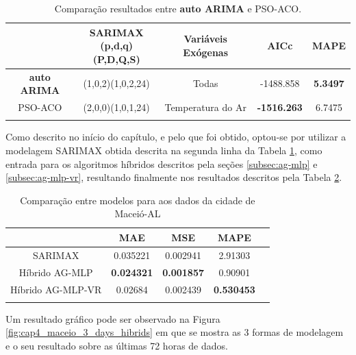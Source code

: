 \begin{table}[htbp]
\caption{Comparação resultados entre \textbf{auto ARIMA} e PSO-ACO.}
\begin{center}
\begin{tabular}{ccccc}
                    & \Longstack{SARIMAX \\ (p,d,q)(P,D,Q,S)} & Variáveis Exógenas & AICc & MAPE  \\\hline
\textbf{auto ARIMA} & (1,0,2)(1,0,2,24) & Todas & -1488.858 & \textbf{5.3497} \\\hline
PSO-ACO             & (2,0,0)(1,0,1,24) & Temperatura do Ar & \textbf{-1516.263} & 6.7475 \\\hline
\label{tab:cap4_comp_maceio_autoarima_psoaco}
\end{tabular}
\end{center}
\end{table}

Como descrito no início do capítulo, e pelo que foi obtido, optou-se por utilizar a modelagem SARIMAX obtida descrita na segunda linha da Tabela \ref{tab:cap4_comp_maceio_autoarima_psoaco}, como entrada para os algoritmos híbridos descritos pela seções \ref{subsec:ag-mlp} e \ref{subsec:ag-mlp-vr}, resultando finalmente nos resultados descritos pela Tabela \ref{tab:cap4_comp_maceio_agmlp_agmlpvr}.

\begin{table}[htbp]
\caption{Comparação entre modelos para aos dados da cidade de Maceió-AL}
\begin{center}
\begin{tabular}{ccccc}
                & MAE & MSE & MAPE \\\hline
SARIMAX         & 0.035221 & 0.002941 & 2.91303 \\\hline
Híbrido AG-MLP  & \textbf{0.024321} & \textbf{0.001857} & 0.90901 \\\hline
Híbrido AG-MLP-VR & 0.02684 & 0.002439 & \textbf{0.530453} \\\hline
\label{tab:cap4_comp_maceio_agmlp_agmlpvr}
\end{tabular}
\end{center}
\end{table}

Um resultado gráfico pode ser observado na Figura \ref{fig:cap4_maceio_3_days_hibrids} em que se mostra as 3 formas de modelagem e o seu resultado sobre as últimas 72 horas de dados.

